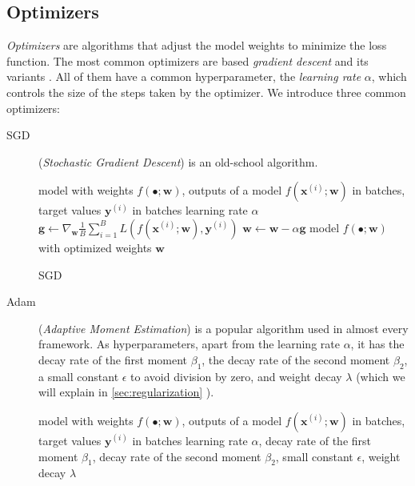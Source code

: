 \subsection{Optimizers}
\label{sec:optimizers}
\emph{Optimizers} are algorithms that adjust the model weights to minimize the loss function.
The most common optimizers are based \emph{gradient descent} and its variants \cite{optimization}.
All of them have a common hyperparameter, the \emph{learning rate} $\alpha$, which controls the size of the steps taken by the optimizer.
We introduce three common optimizers: 
\begin{description}
    \item[SGD] (\emph{Stochastic Gradient Descent}) \cite{deeplearningbook} is an old-school \ml algorithm.
    \begin{algorithm}
        \begin{algorithmic}
        \Require model with weights $f(\bullet;\pmb{w})$, outputs of a model $f(\pmb{x}^{(i)};\pmb{w})$ in batches, target values $\pmb{y}^{(i)}$ in batches
        \Require learning rate $\alpha$
            \State $\pmb{g} \gets \nabla_{\pmb{w}} \frac1B \sum_{i=1}^B L(f(\pmb{x}^{(i)};\pmb{w}),\pmb{y}^{(i)})$
            \State $\pmb{w} \gets \pmb{w} - \alpha \pmb{g}$
        \EndFor
        \Ensure model $f(\bullet;\pmb{w})$ with optimized weights $\pmb{w}$
        \end{algorithmic}
        \caption{SGD}
        \label{alg:sgd}
    \end{algorithm}
    \item[Adam] (\emph{Adaptive Moment Estimation}) \cite{adam} is a popular \dl algorithm used in almost every \dl framework.
    As hyperparameters, apart from the learning rate $\alpha$, it has the decay rate of the first moment $\beta_1$, the decay rate of the second moment $\beta_2$, a small constant $\epsilon$ to avoid division by zero, and weight decay $\lambda$ (which we will explain in \cref{sec:regularization} ).
    \begin{algorithm}
        \begin{algorithmic}[1]
        \Require model with weights $f(\bullet;\pmb{w})$, outputs of a model $f(\pmb{x}^{(i)};\pmb{w})$ in batches, target values $\pmb{y}^{(i)}$ in batches
        \Require learning rate $\alpha$, decay rate of the first moment $\beta_1$, decay rate of the second moment $\beta_2$, small constant $\epsilon$, weight decay $\lambda$

\end{algorithmic}
\end{algorithm}
\end{description}

